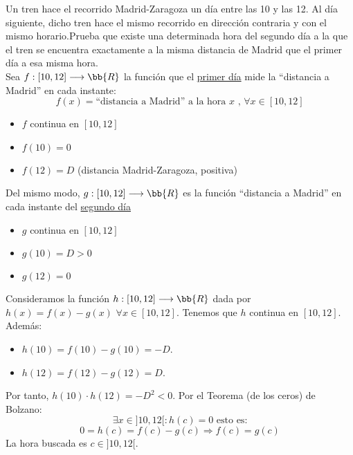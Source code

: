 \documentclass[12pt]{article}
\begin{document}
    \begin{ejercicio}[2 puntos]
        Un tren hace el recorrido Madrid-Zaragoza un día entre las 10 y las 12. Al día siguiente, dicho tren hace el mismo recorrido en dirección contraria y con el mismo horario.Prueba que existe una determinada hora del segundo día a la que el tren se encuentra exactamente a la misma distancia de Madrid que el primer día a esa misma hora.\\
    
        Sea $f:[10,12]\longrightarrow \bb{R}$ la función que el \underline{primer día} mide la ``distancia a Madrid'' en cada instante:
        \[
            f(x) = \text{``distancia a Madrid'' a la hora $x$ , } \forall x \in [10,12]
        \]
        \begin{itemize}
            \item $f$ continua en $[10,12]$
            \item $f(10)=0$
            \item $f(12) = D$ (distancia Madrid-Zaragoza, positiva)
        \end{itemize}

        Del mismo modo, $g:[10,12]\longrightarrow \bb{R}$ es la función ``distancia a Madrid'' en cada instante del \underline{segundo día}
        \begin{itemize}
            \item $g$ continua en $[10,12]$
            \item $g(10)=D>0$
            \item $g(12)=0$
        \end{itemize}

        Consideramos la función $h:[10,12]\longrightarrow \bb{R}$ dada por $h(x) = f(x)-g(x)$ $\forall x \in [10,12]$.
        Tenemos que $h$ continua en $[10,12]$. Además:
        \begin{itemize}
            \item $h(10)= f(10)-g(10) = -D$.
            \item $h(12)=f(12)-g(12) = D$.
        \end{itemize}

            Por tanto, $h(10) \cdot h(12) = -D^2 < 0$. Por el Teorema (de los ceros) de Bolzano:
            \[
                \exists x \in ]10,12[ : h(c) = 0 \text{ esto es:}
            \]
            \[
                0= h(c) = f(c) - g(c) \Longrightarrow f(c) = g(c)
            \]
            La hora buscada es $c \in]10,12[$.
        
    \end{ejercicio}
\end{document}
